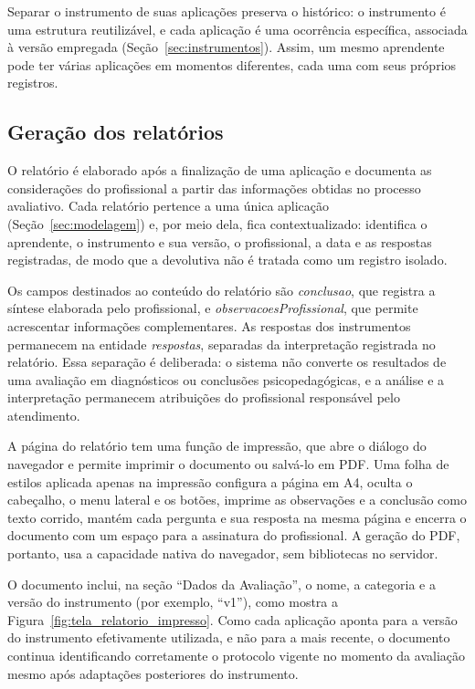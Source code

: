 Separar o instrumento de suas aplicações preserva o histórico: o instrumento é uma estrutura reutilizável, e cada aplicação é uma ocorrência específica, associada à versão empregada (Seção~\ref{sec:instrumentos}). Assim, um mesmo aprendente pode ter várias aplicações em momentos diferentes, cada uma com seus próprios registros.


\subsection{Geração dos relatórios}\label{sec:relatorios}

O relatório é elaborado após a finalização de uma aplicação e documenta as considerações do profissional a partir das informações obtidas no processo avaliativo. Cada relatório pertence a uma única aplicação (Seção~\ref{sec:modelagem}) e, por meio dela, fica contextualizado: identifica o aprendente, o instrumento e sua versão, o profissional, a data e as respostas registradas, de modo que a devolutiva não é tratada como um registro isolado.

Os campos destinados ao conteúdo do relatório são \textit{conclusao}, que registra a síntese elaborada pelo profissional, e \textit{observacoesProfissional}, que permite acrescentar informações complementares. As respostas dos instrumentos permanecem na entidade \textit{respostas}, separadas da interpretação registrada no relatório. Essa separação é deliberada: o sistema não converte os resultados de uma avaliação em diagnósticos ou conclusões psicopedagógicas, e a análise e a interpretação permanecem atribuições do profissional responsável pelo atendimento.

A página do relatório tem uma função de impressão, que abre o diálogo do navegador e permite imprimir o documento ou salvá-lo em PDF. Uma folha de estilos aplicada apenas na impressão configura a página em A4, oculta o cabeçalho, o menu lateral e os botões, imprime as observações e a conclusão como texto corrido, mantém cada pergunta e sua resposta na mesma página e encerra o documento com um espaço para a assinatura do profissional. A geração do PDF, portanto, usa a capacidade nativa do navegador, sem bibliotecas no servidor.

O documento inclui, na seção ``Dados da Avaliação'', o nome, a categoria e a versão do instrumento (por exemplo, ``v1''), como mostra a Figura~\ref{fig:tela_relatorio_impresso}. Como cada aplicação aponta para a versão do instrumento efetivamente utilizada, e não para a mais recente, o documento continua identificando corretamente o protocolo vigente no momento da avaliação mesmo após adaptações posteriores do instrumento.


